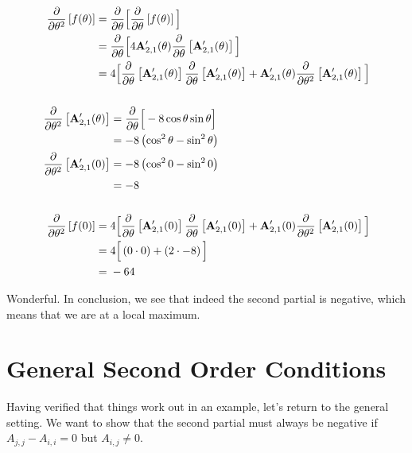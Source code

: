 \documentclass[11pt, oneside]{amsart}
\begin{document}
\begin{equation*}
  \begin{split}
      \frac{\partial }{\partial \theta^2} \left[f(\theta)\right]
    ={}&
      \frac{\partial }{\partial \theta} \Big[ \frac{\partial }{\partial \theta} \left[f(\theta)\right] \Big] \\
    ={}&
      \frac{\partial }{\partial \theta} \Big[
        4
        \mathbf{A}'_{2, 1}(\theta)
        \frac{\partial }{\partial \theta} \left[ \mathbf{A}'_{2, 1}(\theta) \right]
      \Big] \\
    ={}&
      4 \Big[
        \frac{\partial }{\partial \theta} \left[ \mathbf{A}'_{2, 1}(\theta) \right]
        \frac{\partial }{\partial \theta} \left[ \mathbf{A}'_{2, 1}(\theta) \right]
        +
        \mathbf{A}'_{2, 1}(\theta)
        \frac{\partial }{\partial \theta^2} \left[ \mathbf{A}'_{2, 1}(\theta) \right]
      \Big] \\
    \\
      \frac{\partial }{\partial \theta^2} \left[ \mathbf{A}'_{2, 1}(\theta) \right]
    &=
      \frac{\partial }{\partial \theta} \Big[ -8 \cos\theta \sin\theta \Big] \\
    &= -8 \left( \cos^2\theta - \sin^2\theta \right) \\
      \frac{\partial }{\partial \theta^2} \left[ \mathbf{A}'_{2, 1}(0) \right]
    &= -8 \left( \cos^2 0 - \sin^2 0 \right) \\
    &= -8 \\
    \\
      \frac{\partial }{\partial \theta^2} \left[f(0)\right]
    ={}&
      4 \Big[
        \frac{\partial }{\partial \theta} \left[ \mathbf{A}'_{2, 1}(0) \right]
        \frac{\partial }{\partial \theta} \left[ \mathbf{A}'_{2, 1}(0) \right]
        +
        \mathbf{A}'_{2, 1}(0)
        \frac{\partial }{\partial \theta^2} \left[ \mathbf{A}'_{2, 1}(0) \right]
      \Big] \\
    ={}&
      4 \Big[
        \left(0 \cdot 0\right)
        +
        \left(2 \cdot -8\right)
      \Big] \\
    ={}& -64
  \end{split}
\end{equation*}

Wonderful. In conclusion, we see that indeed the second partial is
negative, which means that we are at a local maximum.

\section{General Second Order Conditions}

Having verified that things work out in an example, let's return to the
general setting. We want to show that the second partial must always be
negative if $A_{j, j} - A_{i, i} = 0$ but $A_{i, j} \ne 0$.
\end{document}

